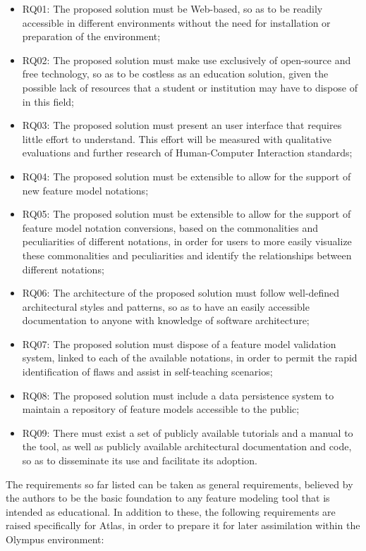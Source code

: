 \begin{itemize}
    \item RQ01: The proposed solution must be Web-based, so as to be readily accessible in different environments without the need for installation or preparation of the environment;
    \item RQ02: The proposed solution must make use exclusively of open-source and free technology, so as to be costless as an education solution, given the possible lack of resources that a student or institution may have to dispose of in this field;
    \item RQ03: The proposed solution must present an user interface that requires little effort to understand. This effort will be measured with qualitative evaluations and further research of Human-Computer Interaction standards;
    \item RQ04: The proposed solution must be extensible to allow for the support of new feature model notations;
    \item RQ05: The proposed solution must be extensible to allow for the support of feature model notation conversions, based on the commonalities and peculiarities of different notations, in order for users to more easily visualize these commonalities and peculiarities and identify the relationships between different notations;
    \item RQ06: The architecture of the proposed solution must follow well-defined architectural styles and patterns, so as to have an easily accessible documentation to anyone with knowledge of software architecture;
    \item RQ07: The proposed solution must dispose of a feature model validation system, linked to each of the available notations, in order to permit the rapid identification of flaws and assist in self-teaching scenarios;
    \item RQ08: The proposed solution must include a data persistence system to maintain a repository of feature models accessible to the public;
    \item RQ09: There must exist a set of publicly available tutorials and a manual to the tool, as well as publicly available architectural documentation and code, so as to disseminate its use and facilitate its adoption.
\end{itemize}

The requirements so far listed can be taken as general requirements, believed by the authors to be the basic foundation to any feature modeling tool that is intended as educational. In addition to these, the following requirements are raised specifically for Atlas, in order to prepare it for later assimilation within the Olympus environment:

